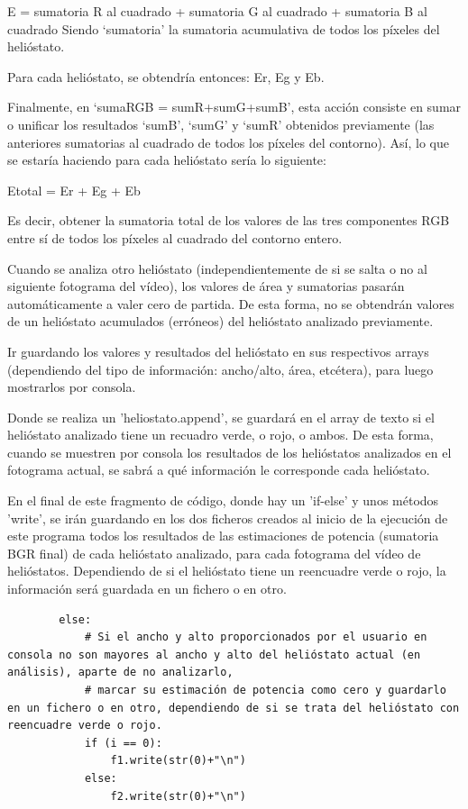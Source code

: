 E = sumatoria R al cuadrado + sumatoria G al cuadrado + sumatoria B al cuadrado
Siendo ‘sumatoria’ la sumatoria acumulativa de todos los píxeles del helióstato.

Para cada helióstato, se obtendría entonces: Er, Eg y Eb.
           
Finalmente, en ‘sumaRGB = sumR+sumG+sumB’, esta acción consiste en sumar o unificar los resultados ‘sumB’, ‘sumG’ y ‘sumR’ obtenidos previamente (las anteriores sumatorias al cuadrado de todos los píxeles del contorno). Así, lo que se estaría haciendo para cada helióstato sería lo siguiente:

Etotal = Er + Eg + Eb

Es decir, obtener la sumatoria total de los valores de las tres componentes RGB entre sí de todos los píxeles al cuadrado del contorno entero.

Cuando se analiza otro helióstato (independientemente de si se salta o no al siguiente fotograma del vídeo), los valores de área y sumatorias pasarán automáticamente a valer cero de partida. De esta forma, no se obtendrán valores de un helióstato acumulados (erróneos) del helióstato analizado previamente.

Ir guardando los valores y resultados del helióstato en sus respectivos arrays (dependiendo del tipo de información: ancho/alto, área, etcétera), para luego mostrarlos por consola.

Donde se realiza un 'heliostato.append', se guardará en el array de texto si el helióstato analizado tiene un recuadro verde, o rojo, o ambos. De esta forma, cuando se muestren por consola los resultados de los helióstatos analizados en el fotograma actual, se sabrá a qué información le corresponde cada helióstato.

En el final de este fragmento de código, donde hay un 'if-else' y unos métodos 'write', se irán guardando en los dos ficheros creados al inicio de la ejecución de este programa todos los resultados de las estimaciones de potencia (sumatoria BGR final) de cada helióstato analizado, para cada fotograma del vídeo de helióstatos. Dependiendo de si el helióstato tiene un reencuadre verde o rojo, la información será guardada en un fichero o en otro.\\[20pt]

\begin{lstlisting}
		else:
            # Si el ancho y alto proporcionados por el usuario en consola no son mayores al ancho y alto del helióstato actual (en análisis), aparte de no analizarlo,
            # marcar su estimación de potencia como cero y guardarlo en un fichero o en otro, dependiendo de si se trata del helióstato con reencuadre verde o rojo.
            if (i == 0):
                f1.write(str(0)+"\n")
            else:
                f2.write(str(0)+"\n")
\end{lstlisting}
                
